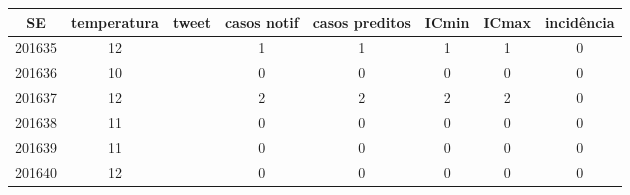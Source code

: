 \begin{tabular}{c|ccccccc}
  \hline
SE & temperatura & tweet & casos notif & casos preditos & ICmin & ICmax & incidência \\ 
  \hline
201635 & 12 &  & 1 & 1 & 1 & 1 & 0 \\ 
  201636 & 10 &  & 0 & 0 & 0 & 0 & 0 \\ 
  201637 & 12 &  & 2 & 2 & 2 & 2 & 0 \\ 
  201638 & 11 &  & 0 & 0 & 0 & 0 & 0 \\ 
  201639 & 11 &  & 0 & 0 & 0 & 0 & 0 \\ 
  201640 & 12 &  & 0 & 0 & 0 & 0 & 0 \\ 
   \hline
\end{tabular}
